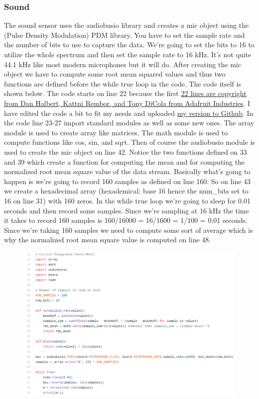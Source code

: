 {\subsubsection{Sound}
The sound sensor uses the audiobusio library and creates a mic object using the (Pulse Density Modulation) PDM library. You have to set the sample rate and the number of bits to use to capture the data. We’re going to set the bits to 16 to utilize the whole spectrum and then set the sample rate to 16 kHz. It’s not quite 44.1 kHz like most modern microphones but it will do. After creating the mic object we have to compute some root mean squared values and thus two functions are defined before the while true loop in the code. The code itself is shown below. The code starts on line 22 because the first \href{https://learn.adafruit.com/adafruit-pdm-microphone-breakout/circuitpython}{22 lines are copyright from Dan Halbert, Kattni Rembor, and Tony DiCola from Adafruit Industries}. I have edited the code a bit to fit my needs and uploaded \href{https://github.com/cmontalvo251/Microcontrollers/blob/master/Circuit_Playground/CircuitPython/Audio/record_sound_simple.py}{my version to Github}. In the code line 23-27 import standard modules as well as some new ones. The array module is used to create array like matrices. The math module is used to compute functions like cos, sin, and sqrt. Then of course the audiobusio module is used to create the mic object on line 42. Notice the two functions defined on 33 and 39 which create a function for computing the mean and for computing the normalized root mean square value of the data stream. Basically what’s going to happen is we’re going to record 160 samples as defined on line 160. So on line 43 we create a hexadecimal array (hexademical: base 16 hence the num\_bits set to 16 on line 31) with 160 zeros. In the while true loop we’re going to sleep for 0.01 seconds and then record some samples. Since we’re sampling at 16 kHz the time it takes to record 160 samples is 160/16000 = 16/1600 = 1/100 = 0.01 seconds. Since we’re taking 160 samples we need to compute some sort of average which is why the normalized root mean square value is computed on line 48.
\begin{figure}[H]
  \begin{center}
    \includegraphics[width=\textwidth]{Figures/sound_code.png}

\end{center}
\end{figure}}
